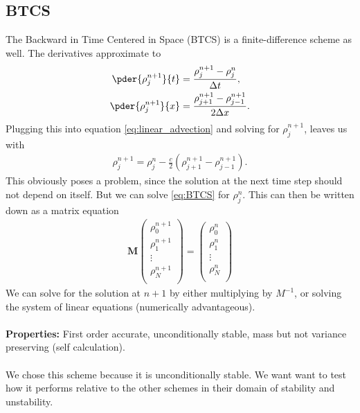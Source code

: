 \subsection{BTCS}
The Backward in Time Centered in Space  (BTCS) is a finite-difference scheme as well. The derivatives approximate to
\begin{align}
\pder{\rho^{n+1}_j}{t}&=\frac{\rho_j^{n+1}-\rho_j^{n}}{\Delta t},\\
\pder{\rho^{n+1}_j}{x}&=\frac{\rho_{j+1}^{n+1}-\rho_{j-1}^{n+1}}{2\Delta x}.
\end{align}
Plugging this into equation \cref{eq:linear_advection} and solving for $\rho^{n+1}_j$, leaves us with
\begin{align}
\rho_j^{n+1}=\rho_j^n-\frac c2\left(\rho_{j+1}^{n+1}-\rho_{j-1}^{n+1}\right).\label{eq:BTCS}
\end{align}
This obviously poses a problem, since the solution at the next time step should not depend on itself. But we can solve  \cref{eq:BTCS} for $\rho_j^n$.
This can then be written down as a matrix equation
\begin{align}
\bm M \begin{pmatrix}
\rho^{n+1}_0\\
\rho^{n+1}_1\\
\vdots\\
\rho^{n+1}_N\\
\end{pmatrix}
=
\begin{pmatrix}
\rho^{n}_0\\
\rho^{n}_1\\
\vdots\\
\rho^{n}_N\\
\end{pmatrix}
\end{align}
We can solve for the solution at $n+1$ by either multiplying by $M^{-1}$, or solving the system of linear equations (numerically advantageous). \\ \\
\textbf{Properties:} First order accurate, unconditionally stable, mass but not variance preserving (self calculation). \cite[p.61]{lec}\\ \\
We chose this scheme because it is unconditionally stable. We want want to test how it performs relative to the other schemes in their domain of stability and unstability. 
